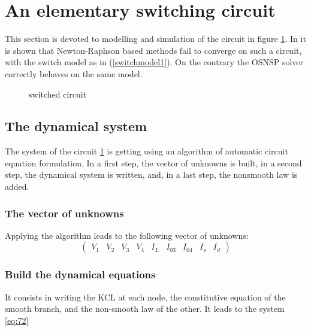 \documentclass{article}
\begin{document}
\section{An elementary switching circuit}
\label{section3}


This section is devoted to modelling and simulation of the circuit in figure \ref{fig:figcircuit1}. In \cite{maffezzoni2006} it is shown that Newton-Raphson based methods fail to converge on such a circuit, with the switch model as in (\ref{switchmodel1}). On the contrary the OSNSP solver correctly behaves on the same model.  

\begin{figure}[h]
  \centering
   \scalebox{0.9}{
  
  }
  \caption{switched circuit}
  \label{fig:figcircuit1}
\end{figure}

\subsection{The dynamical system}
\label{section31}
The system of the circuit \ref{fig:figcircuit1} is getting using an algorithm of automatic circuit equation formulation.
In a first step, the vector of unknowns is built, in a second step, the dynamical system is
written, and, in a last step, the nonsmooth law is added.

\subsubsection{The vector of unknowns}
Applying the algorithm leads to the following vector of unknowns:
\[\left(\begin{array}{ccccccccc}
V_1&V_2&V_3&V_4&I_L&I_{03}&I_{04}&I_s&I_d
\end{array}\right)\]
\subsubsection{Build the dynamical equations}
It consists in writing the KCL at each node, the constitutive equation of the smooth branch, and the
non-smooth law of the other. It leads to the  system \ref{eq:72}
\end{document}
